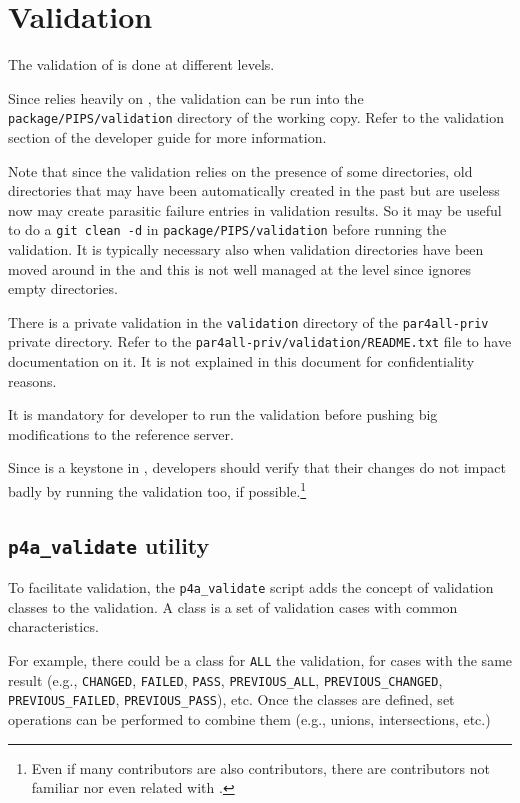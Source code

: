 \documentclass[a4paper]{article}
\begin{document}
\section{Validation}
\label{sec:validation}

The validation of \Apfa is done at different levels.

Since \Apfa relies heavily on \Apips, the \Apips validation can be run
into the \texttt{package/PIPS/validation} directory of the \Agit working
copy. Refer to the validation section of the \Apips developer guide for
more information.

Note that since the validation relies on the presence of some directories,
old directories that may have been automatically created in the past but
are useless now may create parasitic failure entries in validation
results. So it may be useful to do a \texttt{git clean -d} in
\texttt{package/PIPS/validation} before running the \Apips validation.  It
is typically necessary also when validation directories have been moved
around in the \Apips \Asvn and this is not well managed at the \Agit level
since \Agit ignores empty directories.

There is a private validation in the \texttt{validation} directory of the
\texttt{par4all-priv} private directory. Refer to the
\texttt{par4all-priv/validation/README.txt} file to have documentation on
it. It is not explained in this document for confidentiality reasons.

It is mandatory for \Apfa developer to run the validation before pushing
big modifications to the reference \Agit server.

Since \Apips is a keystone in \Apfa, \Apips developers should verify that
their changes do not impact badly \Apfa by running the validation too, if
possible.\footnote{Even if many \Apips contributors are also \Apfa
  contributors, there are \Apips contributors not familiar nor even
  related with \Apfa.}


\subsection{\protect\texttt{p4a\_validate} utility}
\label{sec:p4a_validate-utility}


To facilitate validation, the \verb|p4a_validate|
script adds the concept of validation classes to the \Apips
validation. A class is a set of validation cases with common characteristics.

For example, there could be a class for \texttt{ALL} the
validation, for cases with the same result (e.g.,
\texttt{CHANGED}, \texttt{FAILED}, \texttt{PASS}, \verb|PREVIOUS_ALL|,
\verb|PREVIOUS_CHANGED|, \verb|PREVIOUS_FAILED|, \verb|PREVIOUS_PASS|),
etc. Once the classes are defined, set operations can be performed to combine
them (e.g., unions, intersections, etc.)
\end{document}
